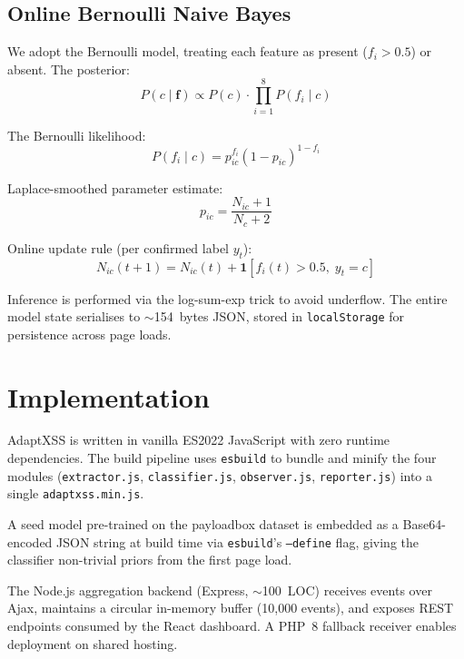 \documentclass[conference]{IEEEtran}
\begin{document}
\subsection{Online Bernoulli Naive Bayes}
We adopt the Bernoulli model, treating each feature as present ($f_i > 0.5$) or absent. The posterior:
\begin{equation}
P(c \mid \mathbf{f}) \propto P(c) \cdot \prod_{i=1}^{8} P(f_i \mid c)
\end{equation}

The Bernoulli likelihood:
\begin{equation}
P(f_i \mid c) = p_{ic}^{f_i}(1-p_{ic})^{1-f_i}
\end{equation}

Laplace-smoothed parameter estimate:
\begin{equation}
p_{ic} = \frac{N_{ic} + 1}{N_c + 2}
\end{equation}

Online update rule (per confirmed label $y_t$):
\begin{equation}
N_{ic}(t{+}1) = N_{ic}(t) + \mathbf{1}[f_i(t) > 0.5,\; y_t = c]
\end{equation}

Inference is performed via the log-sum-exp trick to avoid underflow. The entire model state serialises to $\sim$154~bytes JSON, stored in \texttt{localStorage} for persistence across page loads.

\section{Implementation}

AdaptXSS is written in vanilla ES2022 JavaScript with zero runtime dependencies. The build pipeline uses \texttt{esbuild} to bundle and minify the four modules (\texttt{extractor.js}, \texttt{classifier.js}, \texttt{observer.js}, \texttt{reporter.js}) into a single \texttt{adaptxss.min.js}.

A seed model pre-trained on the payloadbox dataset is embedded as a Base64-encoded JSON string at build time via \texttt{esbuild}'s \texttt{--define} flag, giving the classifier non-trivial priors from the first page load.

The Node.js aggregation backend (Express, $\sim$100~LOC) receives events over Ajax, maintains a circular in-memory buffer (10,000 events), and exposes REST endpoints consumed by the React dashboard. A PHP~8 fallback receiver enables deployment on shared hosting.
\end{document}

